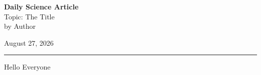\documentclass[14pt, a4paper]{extarticle}
\newcommand{\docTopic}{The Title}
\newcommand{\docAuthor}{Author}
\newcommand{\docDate}{August 27, 2026}
\begin{document}
\noindent
\begin{minipage}[b]{0.6\textwidth}
    {\fontsize{22pt}{26pt}\selectfont \textbf{Daily Science Article}}\\[4pt]
    {\fontsize{18pt}{22pt}\selectfont Topic: \docTopic}\\[4pt]
    {\fontsize{16pt}{20pt}\selectfont by \docAuthor}
\end{minipage}%
\hfill
\begin{minipage}[b]{0.35\textwidth}
    \raggedleft
    {\fontsize{18pt}{22pt}\selectfont \docDate}
\end{minipage}

\vspace{8pt}
\hrule
\vspace{12pt}

Hello Everyone
\end{document}
